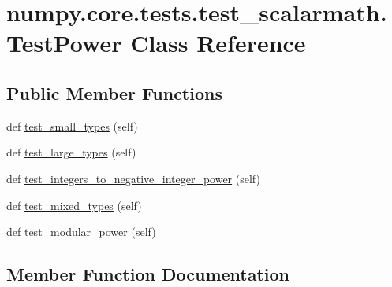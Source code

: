 \hypertarget{classnumpy_1_1core_1_1tests_1_1test__scalarmath_1_1TestPower}{}\section{numpy.\+core.\+tests.\+test\+\_\+scalarmath.\+Test\+Power Class Reference}
\label{classnumpy_1_1core_1_1tests_1_1test__scalarmath_1_1TestPower}
\subsection*{Public Member Functions}
\begin{DoxyCompactItemize}
\item 
def \hyperlink{classnumpy_1_1core_1_1tests_1_1test__scalarmath_1_1TestPower_a94c73deb2e7a6dcce80bda80f89fbbbe}{test\+\_\+small\+\_\+types} (self)
\item 
def \hyperlink{classnumpy_1_1core_1_1tests_1_1test__scalarmath_1_1TestPower_a3de6861b81dcbe40872159ee9a9eaa06}{test\+\_\+large\+\_\+types} (self)
\item 
def \hyperlink{classnumpy_1_1core_1_1tests_1_1test__scalarmath_1_1TestPower_ae1e2980aed7d068e8f17531d05336a0f}{test\+\_\+integers\+\_\+to\+\_\+negative\+\_\+integer\+\_\+power} (self)
\item 
def \hyperlink{classnumpy_1_1core_1_1tests_1_1test__scalarmath_1_1TestPower_a66801fbc98ef1ae4adf9e9d9afcde990}{test\+\_\+mixed\+\_\+types} (self)
\item 
def \hyperlink{classnumpy_1_1core_1_1tests_1_1test__scalarmath_1_1TestPower_a08ab0340232c2b8286a141a6e1a52bee}{test\+\_\+modular\+\_\+power} (self)
\end{DoxyCompactItemize}


\subsection{Member Function Documentation}
\mbox{\label{classnumpy_1_1core_1_1tests_1_1test__scalarmath_1_1TestPower_ae1e2980aed7d068e8f17531d05336a0f}} 
